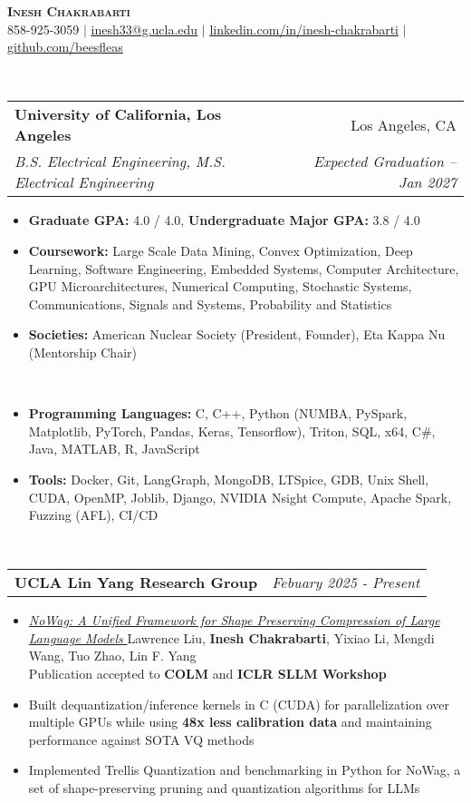 \documentclass[letterpaper,11pt]{article}
\makeatletter
\newcommand{\resitem}[1]{\item #1 \vspace{-8pt}}
\newcommand{\resheading}[1]{\vspace{8pt}{\Large \textbf{#1}}\\\vspace{-8pt}\hrulefill}
\newcommand{\ressubheading}[4]{\vspace{3pt}
\begin{tabular*}{7.0in}{l@{\cftdotfill{\cftsecdotsep}\extracolsep{\fill}}r}
		\textbf{#1} & #2 \\
		\textit{#3} & \textit{#4} \\
\end{tabular*}\vspace{-6pt}}
\newcommand{\ressubheadingsmol}[2]{\vspace{1pt}
\begin{tabular*}{7.0in}{l@{\cftdotfill{\cftsecdotsep}\extracolsep{\fill}}r}
		\textbf{#1} & \textit{#2} \\
\end{tabular*}\vspace{-6pt}}
\makeatother
\begin{document}
    
\begin{center}
    \textbf{\LARGE \scshape Inesh Chakrabarti} \\ \vspace{1pt}
    \small 858-925-3059 $|$ \href{mailto:inesh33@g.ucla.edu}{\underline{inesh33@g.ucla.edu}} $|$ 
    \href{https://www.linkedin.com/in/inesh-chakrabarti-878602183}{\underline{linkedin.com/in/inesh-chakrabarti}} $|$
    \href{https://github.com/beesfleas}{\underline{github.com/beesfleas}}
\end{center}

\resheading{Education}
\ressubheading{University of California, Los Angeles}{Los Angeles, CA}{B.S. Electrical Engineering, M.S. Electrical Engineering}{Expected Graduation -- Jan 2027}
\begin{itemize}
	\resitem{\textbf{Graduate GPA:} 4.0 / 4.0, \textbf{Undergraduate Major GPA:} 3.8 / 4.0}
	\resitem{\textbf{Coursework:} Large Scale Data Mining, Convex Optimization, Deep Learning, Software Engineering, Embedded Systems, Computer Architecture, GPU Microarchitectures, Numerical Computing, Stochastic Systems,  Communications, Signals and Systems, Probability and Statistics}
    \resitem{\textbf{Societies:} American Nuclear Society (President, Founder), Eta Kappa Nu (Mentorship Chair)}
\end{itemize}

\resheading{Skills}
\begin{itemize}
\resitem{\textbf{Programming Languages:} C, C++, Python (NUMBA, PySpark, Matplotlib, PyTorch, Pandas, Keras, Tensorflow), Triton, SQL, x64, C\#, Java, MATLAB, R, JavaScript}
\resitem{\textbf{Tools:} Docker, Git, LangGraph, MongoDB, LTSpice, GDB, Unix Shell, CUDA, OpenMP, Joblib, Django, NVIDIA Nsight Compute, Apache Spark, Fuzzing (AFL), CI/CD}
\end{itemize}

\resheading{Experience}
\ressubheadingsmol{UCLA Lin Yang Research Group}{Febuary 2025 - Present}{}
\begin{itemize}
  \resitem{\href{https://arxiv.org/abs/2504.14569}{\textit{NoWag: A Unified Framework for Shape Preserving Compression of Large Language Models} 
    } Lawrence Liu, \textbf{Inesh Chakrabarti}, Yixiao Li, Mengdi Wang, Tuo Zhao, Lin F. Yang \\ Publication accepted to \textbf{COLM} and \textbf{ICLR SLLM Workshop}}
    \resitem{Built dequantization/inference kernels in C (CUDA) for parallelization over multiple GPUs while using \textbf{48x less calibration data }and maintaining performance against SOTA VQ methods}
   \resitem{Implemented Trellis Quantization and benchmarking in Python for NoWag, a set of shape-preserving pruning and quantization algorithms for LLMs}
\end{itemize}
\end{document}
